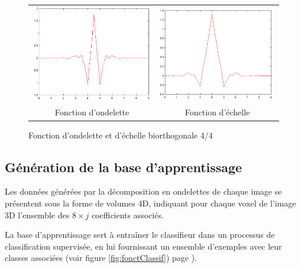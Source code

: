 \begin{figure}
 \begin{tabular}{ c c }
 
 \includegraphics[width=8cm]{images/bior44Ondelette} & \includegraphics[width=8cm]{images/bior44Echelle} \\
 Fonction d'ondelette & Fonction d'échelle\\
 \end{tabular}

 \caption{Fonction d'ondelette et d'échelle biorthogonale 4/4}
 \label{fig:bior44}
\end{figure}

\subsection{Génération de la base d'apprentissage}
Les données générées par la décomposition en ondelettes de chaque image se présentent sous la forme de volumes 4D, indiquant pour chaque voxel de l'image 3D l'ensemble des $8 \times j$ coefficients associés.

La base d'apprentissage sert à entraîner le classifieur dans un processus de classification supervisée, en lui fournissant un ensemble d'exemples avec leur classes associées (voir figure \ref{fig:fonctClassif}) page \pageref{fig:fonctClassif}).

